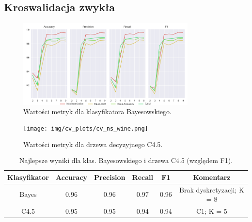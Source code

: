 \subsection*{Kroswalidacja zwykła}

\begin{figure}[H]
\center
    \includegraphics[width=0.8\textwidth]{img/cv_scores_kfold/scoring_kfold_wine.png}
    \caption{Wartości metryk dla klasyfikatora Bayesowskiego.}
\end{figure}

\begin{figure}[H]
    \center
    \texttt{[image: img/cv\_plots/cv\_ns\_wine.png]}
    \caption{Wartości metryk dla drzewa decyzyjnego C4.5.}
\end{figure}

\begin{table}[H]
  \center
  \begin{tabular}{|c|c|c|c|c|c|}
    \hline
    Klasyfikator & Accuracy & Precision & Recall & F1 & Komentarz \\ \hline
    Bayes        & 0.96     & 0.96      & 0.97   & 0.96 & Brak dyskretyzacji; K = 8 \\ \hline
    C4.5         & 0.95     & 0.95      & 0.94   & 0.94 & C1; K = 5 \\ \hline
  \end{tabular}

  \caption{Najlepsze wyniki dla klas. Bayesowskiego i drzewa C4.5 (względem F1).}
\end{table}

